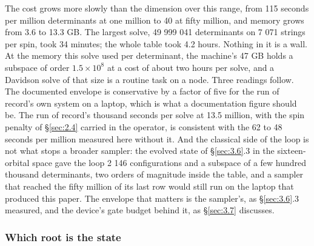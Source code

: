 \documentclass[11pt]{article}
\begin{document}
The cost grows more slowly than the dimension over this range, from 115 seconds per million determinants at one million to 40 at fifty million, and memory grows from 3.6 to 13.3 GB. The largest solve, 49 999 041 determinants on 7 071 strings per spin, took 34 minutes; the whole table took 4.2 hours. Nothing in it is a wall. At the memory this solve used per determinant, the machine's 47 GB holds a subspace of order $1.5\times10^{8}$ at a cost of about two hours per solve, and a Davidson solve of that size is a routine task on a node. Three readings follow. The documented envelope is conservative by a factor of five for the run of record's own system on a laptop, which is what a documentation figure should be. The run of record's thousand seconds per solve at 13.5 million, with the spin penalty of \S\ref{sec:2.4} carried in the operator, is consistent with the 62 to 48 seconds per million measured here without it. And the classical side of the loop is not what stops a broader sampler: the evolved state of \S\ref{sec:3.6}.3 in the sixteen-orbital space gave the loop 2 146 configurations and a subspace of a few hundred thousand determinants, two orders of magnitude inside the table, and a sampler that reached the fifty million of its last row would still run on the laptop that produced this paper. The envelope that matters is the sampler's, as \S\ref{sec:3.6}.3 measured, and the device's gate budget behind it, as \S\ref{sec:3.7} discusses.

\subsubsection{Which root is the state}\label{sec:3.6.5}
\end{document}
